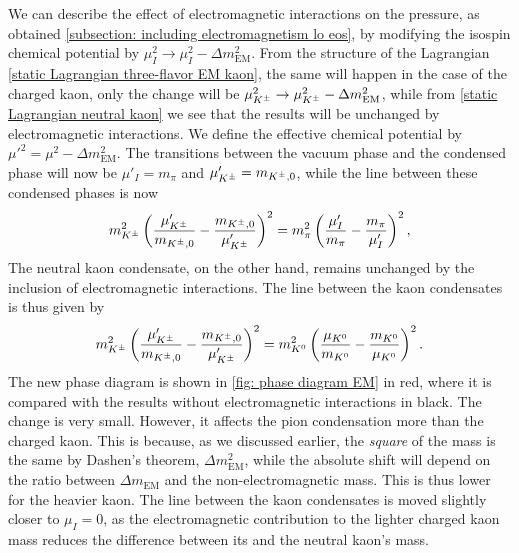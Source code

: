 We can describe the effect of electromagnetic interactions on the pressure, as obtained \autoref{subsection: including electromagnetism lo eos}, by modifying the isospin chemical potential by $\mu^2_I \rightarrow \mu^2_I - \Delta m_\text{EM}^2$.
From the structure of the Lagrangian \autoref{static Lagrangian three-flavor EM kaon}, the same will happen in the case of the charged kaon, only the change will be $\mu^2_{K^\pm} \rightarrow \mu^2_{K^\pm} - \Delta m_\text{EM}^2$, while from \autoref{static Lagrangian neutral kaon} we see that the results will be unchanged by electromagnetic interactions.
We define the effective chemical potential by ${\mu'}^2 = \mu^2 - \Delta m_\text{EM}^2$.
The transitions between the vacuum phase and the condensed phase will now be $\mu'_I = m_\pi$ and $\mu_{K^\pm}' = m_{{K^\pm},0}$, while the line between these condensed phases is now
%
\begin{equation}
    m_{K^\pm}^2
    \left(
         \frac{{\mu_{K^\pm}'}}{m_{{K^\pm},0}}
         - \frac{m_{{K^\pm},0}}{{\mu_{K^\pm}'}} 
        \right)^2
    =
    m_\pi^2  
    \left( 
        \frac{{\mu_I'}}{m_\pi}
        - \frac{m_\pi}{{\mu_I'}}
    \right)^2,
\end{equation}
%
The neutral kaon condensate, on the other hand, remains unchanged by the inclusion of electromagnetic interactions.
The line between the kaon condensates is thus given by
%
\begin{equation}
    m_{K^\pm}^2
    \left(
         \frac{{\mu_{K^\pm}'}}{m_{{K^\pm},0}}
         - \frac{m_{{K^\pm}, 0}}{{\mu_{K^\pm}'}} 
        \right)^2
    =
    m_{K^0}^2  
    \left( 
        \frac{{\mu_{K^0}}}{m_{K^0}}
        - \frac{m_{K^0}}{{\mu_{K^0}}}
    \right)^2.
\end{equation}
%
The new phase diagram is shown in \autoref{fig: phase diagram EM} in red, where it is compared with the results without electromagnetic interactions in black.
The change is very small. 
However, it affects the pion condensation more than the charged kaon.
This is because, as we discussed earlier, the \emph{square} of the mass is the same by Dashen's theorem, $\Delta m_\text{EM}^2$, while the absolute shift will depend on the ratio between $\Delta m_\text{EM}$ and the non-electromagnetic mass.
This is thus lower for the heavier kaon.
The line between the kaon condensates is moved slightly closer to $\mu_I = 0$, as the electromagnetic contribution to the lighter charged kaon mass reduces the difference between its and the neutral kaon's mass.

